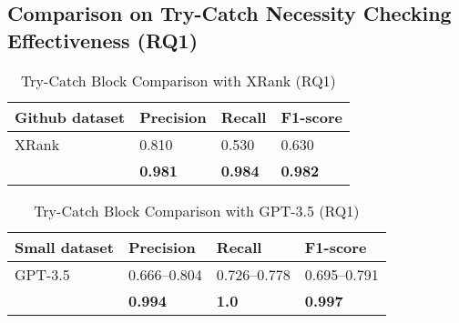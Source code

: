 \subsection{Comparison on Try-Catch Necessity Checking Effectiveness (RQ1)}

\begin{table}[t]%
  \caption{Try-Catch Block Comparison with XRank (RQ1)}
  \vspace{-12pt}
  \small
	\begin{center}
		\renewcommand{\arraystretch}{1}
		\begin{tabular}{| p{3.05cm}<{\centering} | p{1.2cm}<{\centering} | p{1.2cm}<{\centering}| p{1.2cm}<{\centering}|}
		  \hline
			Github dataset  & Precision  &  Recall & F1-score \\
			\hline
			\hline
			XRank & 0.810 & 0.530 & 0.630\\
			\hline
			\tool   &  \textbf{0.981} &  {\bf 0.984} & \textbf{0.982}\\
			\hline
		\end{tabular}
		\label{tab:xblock-1}
	\end{center}
\end{table}

\begin{table}[t]%
  \caption{Try-Catch Block Comparison with GPT-3.5 (RQ1)}
  \vspace{-12pt}
  \small
	\begin{center}
		\renewcommand{\arraystretch}{1}
		\begin{tabular}{| p{1.85cm}<{\centering} | p{1.6cm}<{\centering} | p{1.6cm}<{\centering}| p{1.6cm}<{\centering}|}
		  \hline
		Small dataset	  & Precision  &  Recall & F1-score \\
			\hline
			GPT-3.5  & 0.666--0.804  & 0.726--0.778   & 0.695--0.791\\
			\hline
			\tool   &  \textbf{0.994} &  {\bf 1.0} & \textbf{0.997}\\
			\hline
		\end{tabular}
		\label{tab:xblock-2}
	\end{center}
\end{table}



